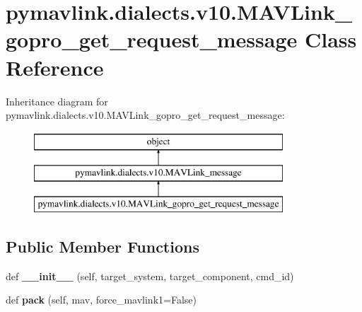 \hypertarget{classpymavlink_1_1dialects_1_1v10_1_1MAVLink__gopro__get__request__message}{}\section{pymavlink.\+dialects.\+v10.\+M\+A\+V\+Link\+\_\+gopro\+\_\+get\+\_\+request\+\_\+message Class Reference}
\label{classpymavlink_1_1dialects_1_1v10_1_1MAVLink__gopro__get__request__message}
Inheritance diagram for pymavlink.\+dialects.\+v10.\+M\+A\+V\+Link\+\_\+gopro\+\_\+get\+\_\+request\+\_\+message\+:\begin{figure}[H]
\begin{center}
\leavevmode
\includegraphics[height=3.000000cm]{classpymavlink_1_1dialects_1_1v10_1_1MAVLink__gopro__get__request__message}
\end{center}
\end{figure}
\subsection*{Public Member Functions}
\begin{DoxyCompactItemize}
\item 
\mbox{\label{classpymavlink_1_1dialects_1_1v10_1_1MAVLink__gopro__get__request__message_a748427e29c85fe3a1a950efd3d6c2bd8}} 
def {\bfseries \+\_\+\+\_\+init\+\_\+\+\_\+} (self, target\+\_\+system, target\+\_\+component, cmd\+\_\+id)
\item 
\mbox{\label{classpymavlink_1_1dialects_1_1v10_1_1MAVLink__gopro__get__request__message_a6e508b157627e4f691ad424cc42f10e9}} 
def {\bfseries pack} (self, mav, force\+\_\+mavlink1=False)
\end{DoxyCompactItemize}
